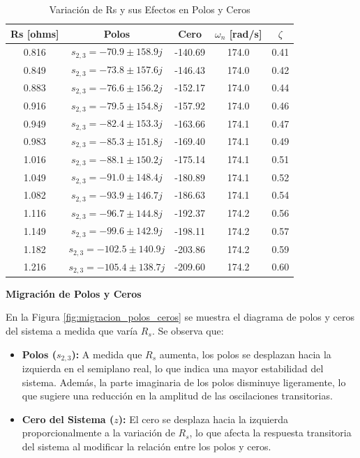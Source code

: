 \documentclass{article}
\begin{document}
\begin{table}[H]
    \centering
    \label{tab:variacion_Rs}
    \begin{tabular}{|c|c|c|c|c|}
        \hline
        \textbf{Rs [ohms]} & \textbf{Polos} & \textbf{Cero} & \textbf{\(\omega_n\) [rad/s]} & \textbf{\(\zeta\)} \\
        \hline
        0.816 & $s_{2,3} = -70.9 \pm 158.9j$ & -140.69 & 174.0 & 0.41 \\
        \hline
        0.849 & $s_{2,3} = -73.8 \pm 157.6j$ & -146.43 & 174.0 & 0.42 \\
        \hline
        0.883 & $s_{2,3} = -76.6 \pm 156.2j$ & -152.17 & 174.0 & 0.44 \\
        \hline
        0.916 & $s_{2,3} = -79.5 \pm 154.8j$ & -157.92 & 174.0 & 0.46 \\
        \hline
        0.949 & $s_{2,3} = -82.4 \pm 153.3j$ & -163.66 & 174.1 & 0.47 \\
        \hline
        0.983 & $s_{2,3} = -85.3 \pm 151.8j$ & -169.40 & 174.1 & 0.49 \\
        \hline
        1.016 & $s_{2,3} = -88.1 \pm 150.2j$ & -175.14 & 174.1 & 0.51 \\
        \hline
        1.049 & $s_{2,3} = -91.0 \pm 148.4j$ & -180.89 & 174.1 & 0.52 \\
        \hline
        1.082 & $s_{2,3} = -93.9 \pm 146.7j$ & -186.63 & 174.1 & 0.54 \\
        \hline
        1.116 & $s_{2,3} = -96.7 \pm 144.8j$ & -192.37 & 174.2 & 0.56 \\
        \hline
        1.149 & $s_{2,3} = -99.6 \pm 142.9j$ & -198.11 & 174.2 & 0.57 \\
        \hline
        1.182 & $s_{2,3} = -102.5 \pm 140.9j$ & -203.86 & 174.2 & 0.59 \\
        \hline
        1.216 & $s_{2,3} = -105.4 \pm 138.7j$ & -209.60 & 174.2 & 0.60 \\
        \hline
    \end{tabular}
    \caption{Variación de Rs y sus Efectos en Polos y Ceros}
\end{table}

\textbf{Migración de Polos y Ceros}

En la Figura \ref{fig:migracion_polos_ceros} se muestra el diagrama de polos y ceros del sistema a medida que varía \( R_s \). Se observa que:

\begin{itemize}
    \item \textbf{Polos (\( s_{2,3} \)):} A medida que \( R_s \) aumenta, los polos se desplazan hacia la izquierda en el semiplano real, lo que indica una mayor estabilidad del sistema. Además, la parte imaginaria de los polos disminuye ligeramente, lo que sugiere una reducción en la amplitud de las oscilaciones transitorias.
    \item \textbf{Cero del Sistema (\( z \)):} El cero se desplaza hacia la izquierda proporcionalmente a la variación de \( R_s \), lo que afecta la respuesta transitoria del sistema al modificar la relación entre los polos y ceros.
\end{itemize}
\end{document}
